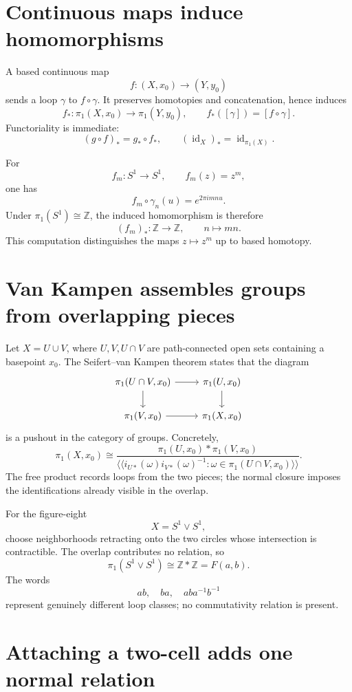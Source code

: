 \section{Continuous maps induce homomorphisms}

A based continuous map
\[
  f:(X,x_0)\to(Y,y_0)
\]
sends a loop \(\gamma\) to \(f\circ\gamma\).  It preserves homotopies and concatenation, hence induces
\[
  f_*:\pi_1(X,x_0)\to\pi_1(Y,y_0),
  \qquad
  f_*([\gamma])=[f\circ\gamma].
\]
Functoriality is immediate:
\[
  (g\circ f)_*=g_*\circ f_*,
  \qquad
  (\operatorname{id}_X)_*=\operatorname{id}_{\pi_1(X)}.
\]

For
\[
  f_m:S^1\to S^1,
  \qquad
  f_m(z)=z^m,
\]
one has
\[
  f_m\circ\gamma_n(u)=e^{2\pi i mn u}.
\]
Under \(\pi_1(S^1)\cong\mathbb Z\), the induced homomorphism is therefore
\[
  (f_m)_*:\mathbb Z\to\mathbb Z,
  \qquad
  n\longmapsto mn.
\]
This computation distinguishes the maps \(z\mapsto z^m\) up to based homotopy.

\section{Van Kampen assembles groups from overlapping pieces}

Let \(X=U\cup V\), where \(U,V,U\cap V\) are path-connected open sets containing a basepoint \(x_0\).  The Seifert--van Kampen theorem states that the diagram
\[
\begin{tikzcd}
\pi_1(U\cap V,x_0) \arrow[r] \arrow[d]
  & \pi_1(U,x_0) \arrow[d] \\
\pi_1(V,x_0) \arrow[r]
  & \pi_1(X,x_0)
\end{tikzcd}
\]
is a pushout in the category of groups.  Concretely,
\[
  \pi_1(X,x_0)
  \cong
  \frac{\pi_1(U,x_0)*\pi_1(V,x_0)}
  {\langle\!\langle i_{U*}(\omega)i_{V*}(\omega)^{-1}:\omega\in\pi_1(U\cap V,x_0)\rangle\!\rangle}.
\]
The free product records loops from the two pieces; the normal closure imposes the identifications already visible in the overlap.

For the figure-eight
\[
  X=S^1\vee S^1,
\]
choose neighborhoods retracting onto the two circles whose intersection is contractible.  The overlap contributes no relation, so
\[
  \boxed{\pi_1(S^1\vee S^1)\cong\mathbb Z*\mathbb Z=F(a,b).}
\]
The words
\[
  ab,
  \quad
  ba,
  \quad
  aba^{-1}b^{-1}
\]
represent genuinely different loop classes; no commutativity relation is present.

\section{Attaching a two-cell adds one normal relation}


